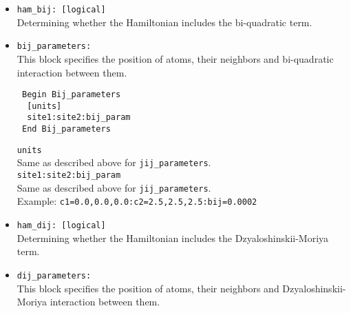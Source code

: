 \documentclass[10pt]{report}
\begin{document}
\begin{itemize}
\begin{itemize} [label=$\diamond$]
Which means two atoms 
 are located in (0.0,0.0,0.0) and (0.5,0.5,0.5) respectively  
in fractional coordinates
have exchange interaction equal to $0.004$
in energy unit specified by the {\tt units} in the first line. 
\item {\tt shell} \\
Optional: If {\tt spin\_correlation = true}, the shell number 
should specify as "{\tt sh=?}" in {\tt jij\_parameters} block.\\
Example: {\tt sh = 1}\\
Which means the atoms at the {\tt site1} and {\tt site2} positions are the first neighbors of each other. 
\item {\tt sigma} \\
Optional: If {\tt spin\_glass = true}, the value of 
broadening of Gaussian function for random number generator 
determine as {\tt sig=} in units specified by the optional
{\tt units} in the first line\\
Example: {\tt sig = 0.2}\\ 
Which sets the sigma parameter to $0.2$ in the units specified by {\tt units}.\\
\end{itemize}
\item {\tt ham\_bij: [logical]}                          \\
Determining whether the Hamiltonian includes the bi-quadratic term.
\item {\tt bij\_parameters: }                   \\
This block specifies the position of atoms, their neighbors and bi-quadratic interaction between them.   
\begin{verbatim}
 Begin Bij_parameters
  [units]
  site1:site2:bij_param
 End Bij_parameters
\end{verbatim}
{\tt units}\\
Same as described above for {\tt jij\_parameters}.\\
{\tt site1:site2:bij\_param}\\
Same as described above for {\tt jij\_parameters}.\\
Example:
{\tt c1=0.0,0.0,0.0:c2=2.5,2.5,2.5:bij=0.0002}
\item {\tt ham\_dij: [logical]}                          \\
Determining whether the Hamiltonian includes the Dzyaloshinskii-Moriya term.
\item {\tt dij\_parameters: }                   \\
This block specifies the position of atoms, their neighbors and Dzyaloshinskii-Moriya interaction between them.    

\end{itemize}
\end{document}
